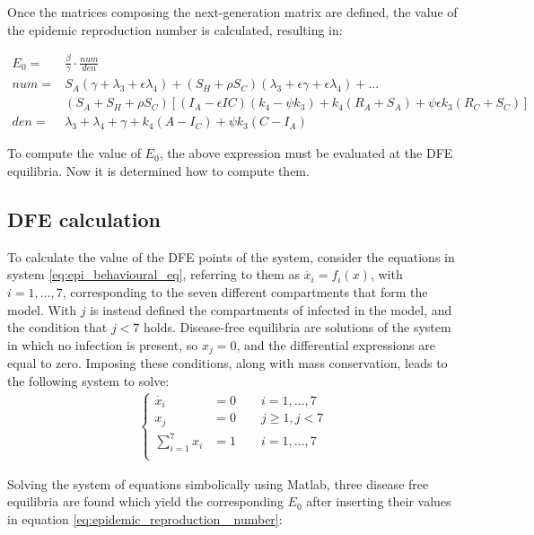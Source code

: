Once the matrices composing the next-generation matrix are defined, the value of the epidemic reproduction number is calculated, resulting in:

\begin{equation}
	\begin{split}
		E_0 = &\frac{\beta}{\gamma} \cdot \frac{num}{den} \\
		num = &S_A(\gamma+\lambda_3+\epsilon \lambda_4)+ (S_H + \rho S_C)(\lambda_3+\epsilon \gamma+\epsilon \lambda_4) + ...\\
		& (S_A + S_H + \rho S_C)[(I_A-\epsilon IC)(k_4 - \psi k_3)+k_4(R_A+S_A)+\psi \epsilon k_3 (R_C+S_C)]\\
		den = &\lambda_3+\lambda_4+\gamma+k_4(A-I_C)+\psi k_3 (C-I_A)
	\end{split}
	\label{eq:epidemic_reproduction _number}
\end{equation}

To compute the value of $E_0$, the above expression must be evaluated at the DFE equilibria. Now it is determined how to compute them.

\subsection{DFE calculation}
To calculate the value of the DFE points of the system, consider the equations in system \eqref{eq:epi_behavioural_eq}, referring to them as $\dot{x_i} = f_i(x)$, with $i = 1,\dots,7$, corresponding to the seven different compartments that form the model. With $j$ is instead defined the compartments of infected in the model, and the condition that $j < 7$ holds.
Disease-free equilibria are solutions of the system in which no infection is present, so $x_j = 0$, and the differential expressions are equal to zero. Imposing these conditions, along with mass conservation, leads to the following system to solve:
\begin{align*}
	\begin{cases} 
		\dot{x_i} &= 0  \quad \quad   i = 1,...,7\\
		x_j &= 0	\quad \quad	 j \ge 1, j <7	\\
		\sum_{i = 1}^{7} x_i &= 1 \quad \quad i = 1,...,7 \\
	\end{cases}
	\label{eq:epi_behavioural_eq2}
\end{align*}

Solving the system of equations simbolically using Matlab, three disease free equilibria are found which yield the corresponding $E_0$ after inserting their values in equation \eqref{eq:epidemic_reproduction _number}:

